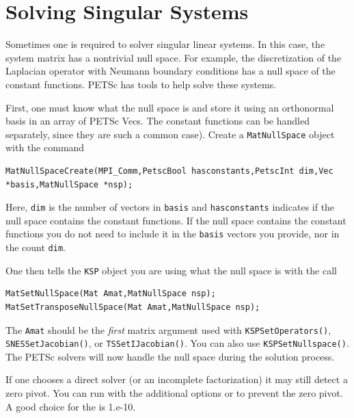 \section{Solving Singular Systems}
\label{sec_singular}

Sometimes one is required to solver singular linear systems. 
In this case, the system matrix has a nontrivial null space. For example, the 
discretization of the Laplacian operator with Neumann boundary conditions
has a null space of the constant functions. PETSc has tools to help
solve these systems.

First, one must know what the null space is and store it using an orthonormal basis
in an array of PETSc Vecs. The constant functions can be handled separately, since
they are such a common case). Create a \lstinline{MatNullSpace} object with the command
\begin{lstlisting}
MatNullSpaceCreate(MPI_Comm,PetscBool hasconstants,PetscInt dim,Vec *basis,MatNullSpace *nsp);
\end{lstlisting}
Here, \lstinline{dim} is the number of vectors in \lstinline{basis} and \lstinline{hasconstants} indicates
if the null space contains the constant functions. If the null space contains the constant
functions you do not need to include it in the \lstinline{basis} vectors you provide, nor in the count \lstinline{dim}.

One then tells the \lstinline{KSP} object you are using what the null space is with the call
\begin{lstlisting}
MatSetNullSpace(Mat Amat,MatNullSpace nsp);
MatSetTransposeNullSpace(Mat Amat,MatNullSpace nsp);
\end{lstlisting}
The \lstinline{Amat} should be the \emph{first} matrix argument used with \lstinline{KSPSetOperators()}, \lstinline{SNESSetJacobian()}, or \lstinline{TSSetIJacobian()}. You can also use \lstinline{KSPSetNullspace()}.
The PETSc solvers will now handle the null space during the solution process.

If one chooses a direct solver (or an incomplete factorization)
it may still detect a zero pivot. 
You can run with the additional options
 or
    to
prevent the zero pivot. A good choice for the  is 1.e-10.

